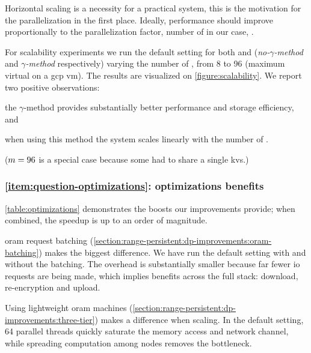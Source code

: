 			Horizontal scaling is a necessity for a practical system, this is the motivation for the parallelization in the first place.
			Ideally, performance should improve proportionally to the parallelization factor, number of  in our case, \oramsNumber{}.

			For scalability experiments we run the default setting for both \protocolNoGamma{} and \protocolGamma{} (\emph{no-$\gamma$-method} and \emph{$\gamma$-method} respectively) varying the number of  \oramsNumber{}, from 8 to 96 (maximum virtual  on a \acrshort{gcp} \acrshort{vm}).
			The results are visualized on \cref{figure:scalability}.
			We report two positive observations:
			\begin{enumerate*}[label={(\roman*)}]
				\item the $\gamma$-method provides substantially better performance and storage efficiency, and
				\item when using this method the system scales linearly with the number of .
			\end{enumerate*}
			($m = 96$ is a special case because some  had to share a single \acrshort{kvs}.)

		\subsubsection*{\textbf{\texorpdfstring{\ref{item:question-optimizations}:}{} optimizations benefits}}

			

			\cref{table:optimizations} demonstrates the boosts our improvements provide; when combined, the speedup is up to an order of magnitude.

			\acrshort{oram} request batching (\cref{section:range-persistent:dp-improvements:oram-batching}) makes the biggest difference.
			We have run the default setting with and without the batching.
			The overhead is substantially smaller because far fewer \acrshort{io} requests are being made, which implies benefits across the full stack: download, re-encryption and upload.

			Using lightweight \acrshort{oram} machines (\cref{section:range-persistent:dp-improvements:three-tier}) makes a difference when scaling.
			In the default setting, 64 parallel threads quickly saturate the memory access and network channel, while spreading computation among nodes removes the bottleneck.

